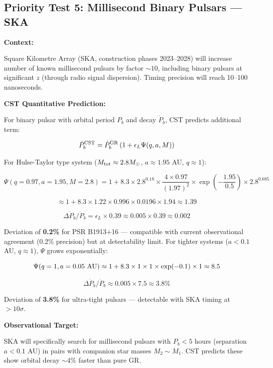 \documentclass[11pt,a4paper]{article}
\begin{document}
\hypertarget{priority-test-5-millisecond-binary-pulsars-ska}{%
\subsection{Priority Test 5: Millisecond Binary Pulsars ---
SKA}\label{priority-test-5-millisecond-binary-pulsars-ska}}

\textbf{Context:}

Square Kilometre Array (SKA, construction phases 2023--2028) will
increase number of known millisecond pulsars by factor \(\sim 10\),
including binary pulsars at significant \(z\) (through radio signal
dispersion). Timing precision will reach 10--100 nanoseconds.

\textbf{CST Quantitative Prediction:}

For binary pulsar with orbital period \(P_b\) and decay \(\dot P_b\),
CST predicts additional term:

\[\dot P_b^{\rm CST} = \dot P_b^{\rm GR} \left(1 + \epsilon_L \Psi(q, a, M)\right)\]

For Hulse-Taylor type system (\(M_{\rm tot} \approx 2.8 M_\odot\),
\(a \approx 1.95\) AU, \(q \approx 1\)):

\[\Psi(q=0.97, a=1.95, M=2.8) = 1 + 8.3 \times 2.8^{0.18} \times \frac{4\times0.97}{(1.97)^2} \times \exp\left(-\frac{1.95}{0.5}\right) \times 2.8^{0.685}\]

\[\approx 1 + 8.3 \times 1.22 \times 0.996 \times 0.0196 \times 1.94 \approx 1.39\]

\[\Delta\dot P_b/\dot P_b = \epsilon_L \times 0.39 \approx 0.005 \times 0.39 \approx 0.002\]

Deviation of \textbf{0.2\%} for PSR B1913+16 --- compatible with current
observational agreement (0.2\% precision) but at detectability limit.
For tighter systems (\(a < 0.1\) AU, \(q \approx 1\)), \(\Psi\) grows
exponentially:

\[\Psi(q=1, a=0.05~{\rm AU}) \approx 1 + 8.3 \times 1 \times 1 \times \exp(-0.1) \times 1 \approx 8.5\]

\[\Delta\dot P_b/\dot P_b \approx 0.005 \times 7.5 \approx 3.8\%\]

Deviation of \textbf{3.8\%} for ultra-tight pulsars --- detectable with
SKA timing at \(> 10\sigma\).

\textbf{Observational Target:}

SKA will specifically search for millisecond pulsars with \(P_b < 5\)
hours (separation \(a < 0.1\) AU) in pairs with companion star masses
\(M_2 \sim M_1\). CST predicts these show orbital decay \(\sim 4\%\)
faster than pure GR.
\end{document}
